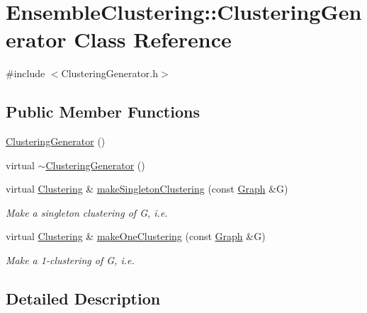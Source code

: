 \hypertarget{class_ensemble_clustering_1_1_clustering_generator}{\section{Ensemble\-Clustering\-:\-:Clustering\-Generator Class Reference}
\label{class_ensemble_clustering_1_1_clustering_generator}
}


{\ttfamily \#include $<$Clustering\-Generator.\-h$>$}

\subsection*{Public Member Functions}
\begin{DoxyCompactItemize}
\item 
\hyperlink{class_ensemble_clustering_1_1_clustering_generator_ab0903498f00fe5fcf2f60e7c51c500f4}{Clustering\-Generator} ()
\item 
virtual \hyperlink{class_ensemble_clustering_1_1_clustering_generator_afd7d065d414d8f51fe584df2bc79577c}{$\sim$\-Clustering\-Generator} ()
\item 
virtual \hyperlink{class_ensemble_clustering_1_1_clustering}{Clustering} \& \hyperlink{class_ensemble_clustering_1_1_clustering_generator_a389692d091d311420c6173d1ae527f56}{make\-Singleton\-Clustering} (const \hyperlink{class_ensemble_clustering_1_1_graph}{Graph} \&G)
\begin{DoxyCompactList}\small\item\em Make a singleton clustering of G, i.\-e. \end{DoxyCompactList}\item 
virtual \hyperlink{class_ensemble_clustering_1_1_clustering}{Clustering} \& \hyperlink{class_ensemble_clustering_1_1_clustering_generator_aceff2507723f4a978f7bf51f0c3577be}{make\-One\-Clustering} (const \hyperlink{class_ensemble_clustering_1_1_graph}{Graph} \&G)
\begin{DoxyCompactList}\small\item\em Make a 1-\/clustering of G, i.\-e. \end{DoxyCompactList}\end{DoxyCompactItemize}


\subsection{Detailed Description}


